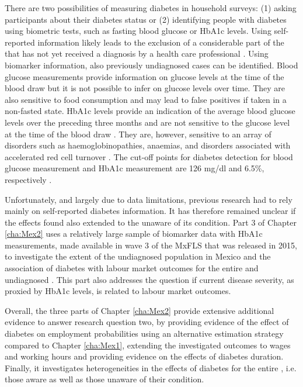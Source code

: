 There are two possibilities of measuring diabetes in household surveys: (1) asking participants about their diabetes status or (2) identifying people with diabetes using biometric tests, such as fasting blood glucose or \ac{HbA1c} levels. Using self-reported information likely leads to the exclusion of a considerable part of the \DIFdelbegin {}\DIFdelend \DIFaddbegin {}\DIFaddend that has not yet received a diagnosis by a health care professional \parencite{Beagley2014}. Using biomarker information, also previously undiagnosed cases can be identified. Blood glucose measurements provide information on glucose levels at the time of the blood draw but it is not possible to infer on glucose levels over time. They are also sensitive to food consumption and may lead to false positives if taken in a non-fasted state. \ac{HbA1c} levels provide an indication of the average blood glucose levels over the preceding three months and are not sensitive to the glucose level at the time of the blood draw \parencite{WorldHealthOrganization2011}. They are, however, sensitive to an array of disorders such as haemoglobinopathies, anaemias, and disorders associated with accelerated red cell turnover \parencite{WorldHealthOrganization2011}. The cut-off points for diabetes detection for blood glucose measurement and \ac{HbA1c} measurement are 126 mg/dl and 6.5\%, respectively \parencite{WorldHealthOrganization2006,WorldHealthOrganization2011}.

Unfortunately, and largely due to data limitations, previous research had to rely mainly on self-reported diabetes information. It has therefore remained unclear if the effects found also extended to the \DIFdelbegin {}\DIFdelend \DIFaddbegin {}\DIFaddend unaware of its condition. Part 3 of Chapter \ref{cha:Mex2} uses a relatively large sample of biomarker data with \ac{HbA1c} measurements, made available in wave 3 of the \ac{MxFLS} that was released in 2015, to investigate the extent of the undiagnosed population in Mexico and the association of diabetes with labour market outcomes for the entire and undiagnosed \DIFdelbegin {}\DIFdelend \DIFaddbegin {}\DIFaddend . This part also addresses the question if current disease severity, as proxied by \ac{HbA1c} levels, is related to labour market outcomes. 

Overall, the three parts of Chapter \ref{cha:Mex2} provide extensive additional evidence to answer research question two, by providing evidence of the effect of diabetes on employment probabilities using an alternative estimation strategy compared to Chapter \ref{cha:Mex1}, extending the investigated outcomes to wages and working hours and providing evidence on the effects of diabetes duration. Finally, it investigates heterogeneities in the effects of diabetes for the entire \DIFdelbegin {}\DIFdelend \DIFaddbegin {}\DIFaddend , i.e. \DIFdelbegin \DIFdel{, }\DIFdelend those aware as well as those unaware of their condition.

